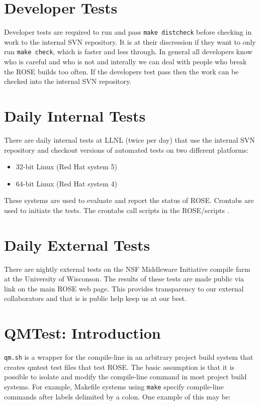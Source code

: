 \section{Developer Tests}
\label{testing::developerTests}
   Developer tests are required to run and pass {\tt make distcheck}
before checking in work to the internal SVN repository.  It is at
their discression if they want to only run {\tt make check}, which is
faster and less through. In general all developers know who is careful and
who is not and interally we can deal with people who break the ROSE 
builds too often.  If the developers test pass then the work
can be checked into the internal SVN repository.

\section{Daily Internal Tests}
\label{testing::dailyInternalTests}
   There are daily internal tests at LLNL (twice per day)
that use the internal SVN repository and checkout versions
of automated tests on two different platforms:
\begin{itemize}
   \item 32-bit Linux (Red Hat system 5)
   \item 64-bit Linux (Red Hat system 4)
\end{itemize}
These systems are used to evaluate and report the status of ROSE.  Crontabs are used
to initiate the tests.  The crontabs call scripts in the ROSE/scripts
.


\section{Daily External Tests}
\label{testing::dailyExternalTests}
   There are nightly external tests on the NSF Middleware Initiative compile farm
at the University of Wisconson. The results of these tests are made public
via link on the main ROSE web page.  This provides transparency to our external
collaborators and that is is public help keep us at our best.




{\scriptsize  }

\section{QMTest: Introduction}
{\tt qm.sh} is a wrapper for the compile-line in an arbitrary project build 
system that creates qmtest test files that test ROSE. The basic assumption
is that it is possible to isolate and modify the compile-line command in most
project build systems. For example, Makefile systems using {\tt make} specify
compile-line commands after labels delimited by a colon. One example of this
may be:

